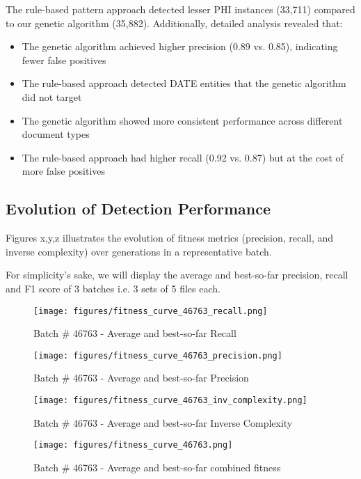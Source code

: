 \documentclass[conference]{IEEEtran}
\begin{document}
The rule-based pattern approach detected lesser PHI instances (33,711) compared to our genetic algorithm (35,882). Additionally, detailed analysis revealed that:

\begin{itemize}
\item The genetic algorithm achieved higher precision (0.89 vs. 0.85), indicating fewer false positives
\item The rule-based approach detected DATE entities that the genetic algorithm did not target
\item The genetic algorithm showed more consistent performance across different document types
\item The rule-based approach had higher recall (0.92 vs. 0.87) but at the cost of more false positives
\end{itemize}

\subsection{\textbf{Evolution of Detection Performance}}
Figures x,y,z illustrates the evolution of fitness metrics (precision, recall, and inverse complexity) over generations in a representative batch.

For simplicity's sake, we will display the average and best-so-far precision, recall and F1 score of 3 batches i.e. 3 sets of 5 files each.

\begin{figure}[htbp]
\centering
\texttt{[image: figures/fitness\_curve\_46763\_recall.png]}
\caption{Batch \# 46763 - Average and best-so-far Recall}
\label{fig:performance-comparison}
\end{figure}

\begin{figure}[htbp]
\centering
\texttt{[image: figures/fitness\_curve\_46763\_precision.png]}
\caption{Batch \# 46763 - Average and best-so-far Precision}
\label{fig:performance-comparison}
\end{figure}

\begin{figure}[htbp]
\centering
\texttt{[image: figures/fitness\_curve\_46763\_inv\_complexity.png]}
\caption{Batch \# 46763 - Average and best-so-far Inverse Complexity}
\label{fig:performance-comparison}
\end{figure}

\begin{figure}[htbp]
\centering
\texttt{[image: figures/fitness\_curve\_46763.png]}
\caption{Batch \# 46763 - Average and best-so-far combined fitness}
\label{fig:performance-comparison}
\end{figure}
\end{document}
